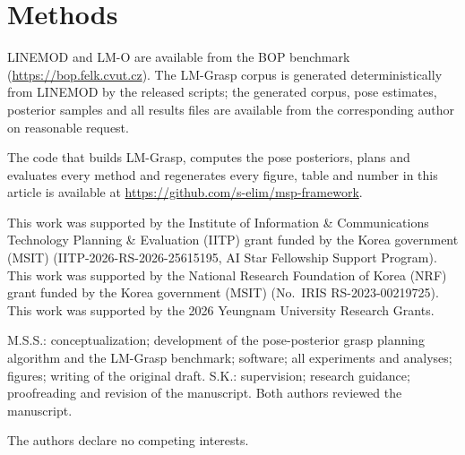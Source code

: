 \documentclass[pdflatex,sn-nature,iicol]{sn-jnl}
\begin{document}
\section{Methods}\label{sec:methods}


\backmatter

LINEMOD and LM-O are available from the BOP benchmark (\url{https://bop.felk.cvut.cz}). The LM-Grasp corpus is generated deterministically from LINEMOD by the released scripts; the generated corpus, pose estimates, posterior samples and all results files are available from the corresponding author on reasonable request.

The code that builds LM-Grasp, computes the pose posteriors, plans and evaluates every method and regenerates every figure, table and number in this article is available at \url{https://github.com/s-elim/msp-framework}.

This work was supported by the Institute of Information \& Communications Technology Planning \& Evaluation (IITP) grant funded by the Korea government (MSIT) (IITP-2026-RS-2026-25615195, AI Star Fellowship Support Program). This work was supported by the National Research Foundation of Korea (NRF) grant funded by the Korea government (MSIT) (No.~IRIS RS-2023-00219725). This work was supported by the 2026 Yeungnam University Research Grants.

M.S.S.: conceptualization; development of the pose-posterior grasp planning algorithm and the LM-Grasp benchmark; software; all experiments and analyses; figures; writing of the original draft. S.K.: supervision; research guidance; proofreading and revision of the manuscript. Both authors reviewed the manuscript.

The authors declare no competing interests.


\end{document}
